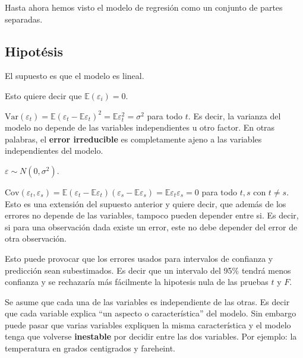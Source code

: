 \documentclass[
  12pt,
]{book}
\providecommand{\tightlist}{%
  \setlength{\itemsep}{0pt}\setlength{\parskip}{0pt}}
\theoremstyle{definition}
\theoremstyle{definition}
\theoremstyle{definition}
\theoremstyle{remark}
\begin{document}
Hasta ahora hemos visto el modelo de regresión como un conjunto de partes separadas.

\hypertarget{hipotuxe9sis}{%
\subsection{Hipotésis}\label{hipotuxe9sis}}

\begin{description}
\tightlist
\item[Independencia lineal]
El supuesto es que el modelo es lineal.
\item[Errores con esperanza nula]
Esto quiere decir que \(\mathbb{E}(\varepsilon_i) = 0\).
\item[Homocedasticidad]
\(\text{Var}(\varepsilon_t) = \mathbb{E}(\varepsilon_t - \mathbb{E} \varepsilon_t)^2 = \mathbb{E} \varepsilon_t^2 = \sigma^2\) para todo \(t\). Es decir, la varianza del modelo no depende de las variables independientes u otro factor. En otras palabras, el \textbf{error irreducible} es completamente ajeno a las variables independientes del modelo.
\item[Normalidad de los residuos]
\(\varepsilon \sim N(0, \sigma^2 )\).
\item[Independencia de los erroes]
\(\text{Cov}(\varepsilon_t,\varepsilon_s ) = \mathbb{E} (\varepsilon_t - \mathbb{E} \varepsilon_t) (\varepsilon_s - \mathbb{E} \varepsilon_s) = \mathbb{E} \varepsilon_t \varepsilon_s = 0\) para todo \(t,s\) con \(t\neq s\). Esto es una extensión del supuesto anterior y quiere decir, que además de los errores no depende de las variables, tampoco pueden depender entre si. Es decir, si para una observación dada existe un error, este no debe depender del error de otra observación.
\end{description}

Esto puede provocar que los errores usados para intervalos de confianza y predicción sean subestimados. Es decir que un intervalo del 95\% tendrá menos confianza y se rechazaría más fácilmente la hipotesis nula de las pruebas \(t\) y \(F\).

\begin{description}
\tightlist
\item[Multicolineaidad]
Se asume que cada una de las variables es independiente de las otras. Es decir que cada variable explica \enquote{un aspecto o característica} del modelo. Sin embargo puede pasar que varias variables expliquen la misma característica y el modelo tenga que volverse \textbf{inestable} por decidir entre las dos variables. Por ejemplo: la temperatura en grados centigrados y fareheint.
\end{description}
\end{document}
